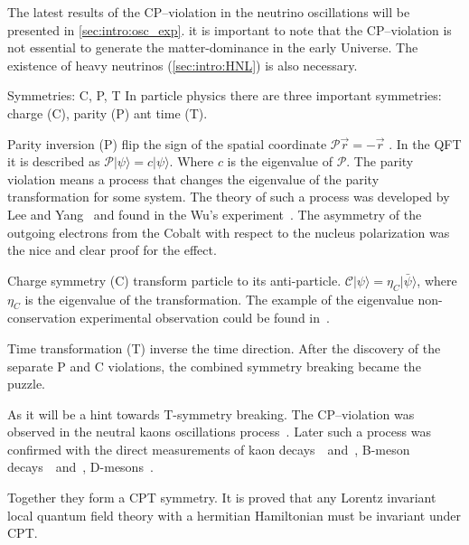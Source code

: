 \documentclass[../main.tex]{subfiles}
\begin{document}
The latest results of the CP--violation in the neutrino oscillations will be presented in \autoref{sec:intro:osc_exp}. it is important to note that the CP--violation is not essential to generate the matter-dominance in the early Universe. The existence of heavy neutrinos (\autoref{sec:intro:HNL}) is also necessary.

\begin{bclogo}[couleur=blue!2, arrondi=0.1, logo=\bcinfo, nobreak=true]{Symmetries: C, P, T}
In particle physics there are three important symmetries: charge (C), parity (P) ant time (T).

Parity inversion (P) flip the sign of the spatial coordinate $\mathcal{P}\overrightarrow{r}=-\overrightarrow{r}$ . In the QFT it is described as $\mathcal{P}\lvert\psi\rangle=c\lvert\psi\rangle$. Where $c$ is the eigenvalue of $\mathcal{P}$. The parity violation means a process that changes the eigenvalue of the parity transformation for some system. The theory of such a process was developed by Lee and Yang~\cite{Lee1956} and found in the Wu's experiment~\cite{Wu1957}. The asymmetry of the outgoing electrons from the Cobalt with respect to the nucleus polarization was the nice and clear proof for the effect.

Charge symmetry (C) transform particle to its anti-particle. $\mathcal{C}\lvert\psi\rangle=\eta_{C}\lvert\bar{\psi}\rangle$, where $\eta_{C}$ is the eigenvalue of the transformation. The example of the eigenvalue non-conservation experimental observation could be found in~\cite{Gormley1968}.

Time transformation (T) inverse the time direction. After the discovery of the separate P and C violations, the combined symmetry breaking became the puzzle.

As it will be a hint towards T-symmetry breaking. The CP--violation was observed in the neutral kaons oscillations process~\cite{Christenson1964}. Later such a process was confirmed with the direct measurements of kaon decays~\cite{Alavi-Harati1999}~and~\cite{Fanti1999}, B-meson decays~\cite{Aubert2001}~and~\cite{Abe2001}, D-mesons~\cite{Aaij2019}.

Together they form a CPT symmetry. It is proved that any Lorentz invariant local quantum field theory with a hermitian Hamiltonian must be invariant under CPT.
\end{bclogo}
\end{document}
